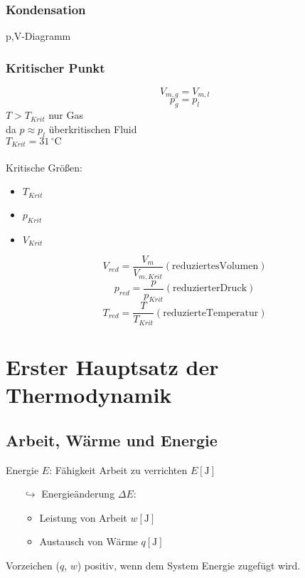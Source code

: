 \documentclass[a4paper, fleqn]{article}
\begin{document}
\subsubsection{Kondensation}
p,V-Diagramm\\
\subsubsection{Kritischer Punkt}
\begin{equation*}
    V_{m,g} = V_{m,l}
\end{equation*}
\begin{equation*}
    p_g = p_l
\end{equation*}
$T > T_{Krit}$ nur Gas\\
da $p \approx p_l$ überkritischen Fluid\\
 $T_{Krit}=31 \, \mathrm{^\circ C}$\\\\
Kritische Größen:
\begin{itemize}
    \item $T_{Krit}$
    \item $p_{Krit}$
    \item $V_{Krit}$
\end{itemize}
\vspace*{1cm}
\begin{equation*}
    V_{red} = \frac{V_m}{V_{m,Krit}} \mathrm{(reduziertes Volumen)}
\end{equation*}
\begin{equation*}
    p_{red} = \frac{p}{p_{Krit}} \mathrm{(reduzierter Druck)}
\end{equation*}
\begin{equation*}
    T_{red} = \frac{T}{T_{Krit}} \mathrm{(reduzierte Temperatur)}
\end{equation*}

\section{Erster Hauptsatz der Thermodynamik}
\subsection{Arbeit, Wärme und Energie}
Energie $E$: Fähigkeit Arbeit zu verrichten $E [\mathrm{J}]$\\
\begin{itemize}
    \item[$\hookrightarrow$] Energieänderung $\Delta E$:
    \begin{itemize}
        \item Leistung von Arbeit $w [\mathrm{J}]$
        \item Austausch von Wärme $q [\mathrm{J}]$
    \end{itemize}
\end{itemize}
Vorzeichen ($q$, $w$) positiv, wenn dem System Energie zugefügt wird.\\
\end{document}

